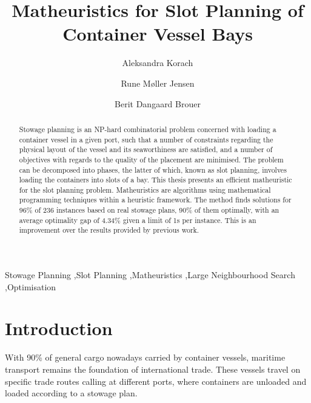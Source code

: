 \documentclass[preprint,12pt,3p]{elsarticle}
\begin{document}
\begin{frontmatter}

\title{Matheuristics for Slot Planning of Container Vessel Bays}


\author[label5]{Aleksandra Korach}

\author[label5]{Rune M{\o}ller Jensen}
\address[label5]{IT University of Copenhagen}

\author[label1]{Berit Dangaard Brouer}
\address[label1]{Address One}



\begin{abstract}
Stowage planning is an NP-hard combinatorial problem concerned with loading a container vessel in a given port, such that a number of constraints regarding the physical layout of the vessel and its seaworthiness are satisfied, and a number of objectives with regards to the quality of the placement are minimised. The problem can be decomposed into phases, the latter of which, known as slot planning, involves loading the containers into slots of a bay. This thesis presents an efficient matheuristic for the slot planning problem. Matheuristics are algorithms using mathematical programming techniques within a heuristic framework. The method finds solutions for 96\% of 236 instances based on real stowage plans, 90\% of them optimally, with an average optimality gap of 4.34\% given a limit of 1s per instance. This is an improvement over the results provided by previous work.
\end{abstract}

\begin{keyword}
Stowage Planning \sep Slot Planning \sep Matheuristics \sep Large Neighbourhood Search \sep Optimisation
\end{keyword}

\end{frontmatter}


\section{Introduction}
\label{sec:Introduction}
With 90\% of general cargo nowadays carried by container vessels, maritime transport remains the foundation of international trade. These vessels travel on specific trade routes calling at different ports, where containers are unloaded and loaded according to a stowage plan. 
\end{document}
